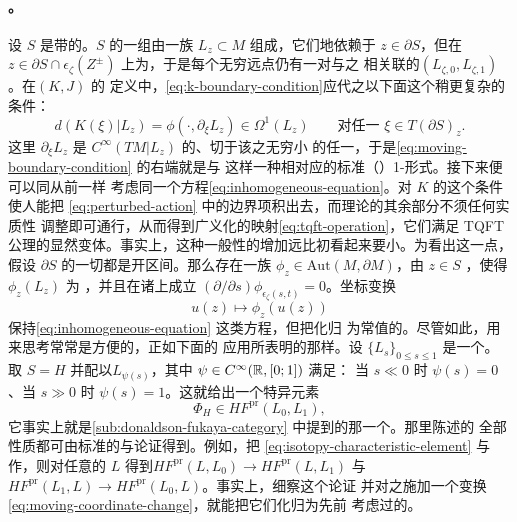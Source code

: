 \paragraph{\trMovingBoundaryCondition。}\label{sub:moving-boundary-conditions}
设 $S$ 是带\trStriplikeEnd{}的\trRiemann\trSurface。$S$ 的一组\trMovingBoundaryCondition{}由一族%
\trExact\trLagrange\trSubmanifold{}$L_z\subset M$ 组成，它们\trSmooth{}地依赖于 $z\in\partial S$，但在
$z\in\partial S\cap\epsilon_\zeta(Z^\pm)$ 上为\trLocallyConstant，于是每个无穷远点仍有一对与之
相关联的\trLagrange\trSubmanifold{}$(L_{\zeta,0},L_{\zeta,1})$。在\trPerturbationDatum{}$(K,J)$ 的
定义中，\eqref{eq:k-boundary-condition}应代之以下面这个稍更复杂的条件：
\begin{equation}\label{eq:moving-boundary-condition}
d(K(\xi)|L_z)=\phi(\cdot,\partial_\xi L_z)\in\Omega^1(L_z)
\qquad\text{对任一 }\xi\in T(\partial S)_z.
\end{equation}
这里 $\partial_\xi L_z$ 是 $C^\infty(TM|L_z)$ 的、切于该\trLagrange\trSubmanifold{}之无穷小%
\trDeformation{}的任一\trSection，于是\eqref{eq:moving-boundary-condition} 的右端就是与
这样一种\trDeformation{}相对应的标准（\trExact）1-形式。接下来便可以同从前一样
考虑同一个方程\eqref{eq:inhomogeneous-equation}。对 $K$ 的这个条件使人能把%
\eqref{eq:perturbed-action} 中的边界项积出去，而理论的其余部分不须任何实质性
调整即可通行，从而得到广义化的映射\eqref{eq:tqft-operation}，它们满足 TQFT
公理的显然变体。事实上，这种一般性的增加远比初看起来要小。为看出这一点，
假设 $\partial S$ 的一切\trConnectedComponent{}都是开区间。那么存在一族\trAutomorphism
$\phi_z\in\mathrm{Aut}(M,\partial M)$，由 $z\in S$ \trParametrization，使得 $\phi_z(L_z)$ 为%
\trLocallyConstant，并且在诸\trStriplikeEnd{}上成立 $(\partial/\partial s)%
\phi_{\epsilon_\zeta(s,t)}=0$。坐标变换
\begin{equation}\label{eq:moving-coordinate-change}
u(z)\longmapsto\phi_z(u(z))
\end{equation}
保持\eqref{eq:inhomogeneous-equation} 这类方程，但把\trMovingBoundaryCondition{}化归
为常值的。尽管如此，用\trMovingBoundaryCondition{}来思考常常是方便的，正如下面的
应用所表明的那样。设 $\{L_s\}_{0\le s\le 1}$ 是一个\trExact\trLagrange\trIsotopy。取 $S=H$
并配以\trMovingBoundaryCondition{}$L_{\psi(s)}$，其中 $\psi\in C^\infty(\mathbb{R},[0;1])$ 满足：
当 $s\ll 0$ 时
$\psi(s)=0$、当 $s\gg 0$ 时 $\psi(s)=1$。这就给出一个特异元素
\begin{equation}\label{eq:isotopy-characteristic-element}
\Phi_H\in HF^{\mathrm{pr}}(L_0,L_1),
\end{equation}
它事实上就是\cref{sub:donaldson-fukaya-category} 中提到的那一个。那里陈述的
全部性质都可由标准的\trHomotopy{}与\trGluing{}论证得到。例如，把%
\eqref{eq:isotopy-characteristic-element} 与\trTriangleProduct{}作\trComposition，则对任意的
$L$ 得到\trIsomorphism{}$HF^{\mathrm{pr}}(L,L_0)\to HF^{\mathrm{pr}}(L,L_1)$ 与
$HF^{\mathrm{pr}}(L_1,L)\to HF^{\mathrm{pr}}(L_0,L)$。事实上，细察这个\trGluing{}论证
并对之施加一个变换\eqref{eq:moving-coordinate-change}，就能把它们化归为先前
考虑过的\trContinuationMap。
